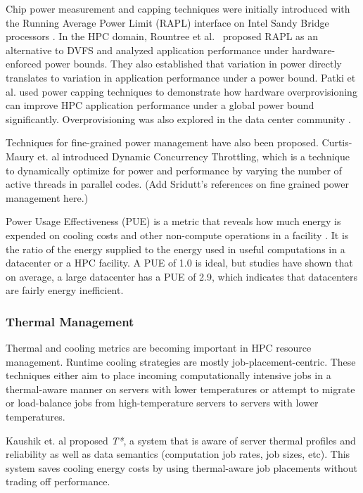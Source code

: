 Chip power measurement and capping techniques were initially introduced with the Running Average Power Limit (RAPL) interface on Intel Sandy Bridge processors \cite{IntelSDM,David2010}. In the HPC domain, Rountree et al.~\cite{Rountree2012} proposed RAPL as an alternative to DVFS and analyzed application performance under hardware-enforced power bounds. They also established that variation in power directly translates to variation in application performance under a power bound. Patki et al. \cite{Patki1} used power capping techniques to demonstrate how hardware overprovisioning can improve HPC application performance under a global power bound significantly. Overprovisioning was also explored in the data center community \cite{femal:04}. 

Techniques for fine-grained power management have also been proposed. Curtis-Maury et. al \cite{Curtis1,Curtis2,Curtis3} introduced Dynamic Concurrency Throttling, which is a technique to dynamically optimize for power and performance by varying the number of active threads in parallel codes. (Add Sridutt's references on fine grained power management here.)

Power Usage Effectiveness (PUE) is a metric that reveals how much energy is expended on cooling costs and other non-compute operations in a facility \cite{Niccolai}. It is the ratio of the energy supplied to the energy used in useful computations in a datacenter or a HPC facility. A PUE of 1.0 is ideal, but studies have shown that on average, a large datacenter has a PUE of 2.9, which indicates that datacenters are fairly energy inefficient. 

\subsubsection{Thermal Management}
Thermal and cooling metrics are becoming important in HPC resource management. Runtime cooling strategies are mostly job-placement-centric. These techniques either aim to place incoming computationally intensive jobs in a thermal-aware manner on servers with lower temperatures or attempt to migrate or load-balance jobs from high-temperature servers to servers with lower temperatures.

Kaushik et. al \cite{kaushik_t*:_2012} proposed \emph{T*}, a system that is aware of server thermal profiles and reliability as well as data semantics (computation job rates, job sizes, etc). This system saves cooling energy costs by using thermal-aware job placements without trading off performance.

